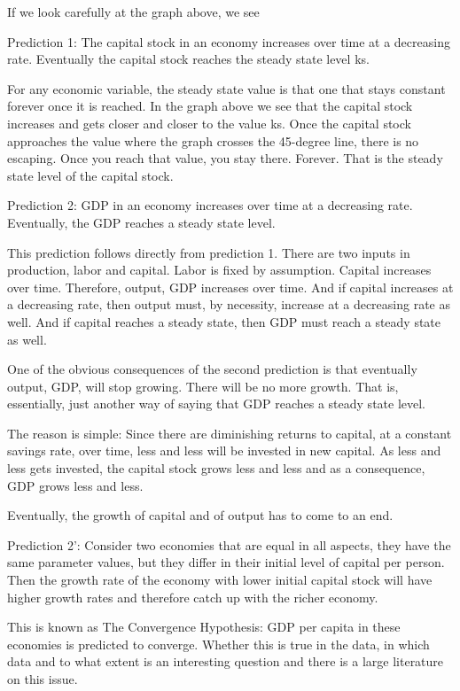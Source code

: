 \documentclass[
]{book}
\begin{document}
If we look carefully at the graph above, we see

Prediction 1: The capital stock in an economy increases over time at a decreasing rate. Eventually the capital stock reaches the steady state level ks.

For any economic variable, the steady state value is that one that stays constant forever once it is reached.
In the graph above we see that the capital stock increases and gets closer and closer to the value ks. Once the capital stock approaches the value where the graph crosses the 45-degree line, there is no escaping. Once you reach that value, you stay there. Forever. That is the steady state level of the capital stock.

Prediction 2: GDP in an economy increases over time at a decreasing rate. Eventually, the GDP reaches a steady state level.

This prediction follows directly from prediction 1. There are two inputs in production, labor and capital. Labor is fixed by assumption. Capital increases over time. Therefore, output, GDP increases over time. And if capital increases at a decreasing rate, then output must, by necessity, increase at a decreasing rate as well. And if capital reaches a steady state, then GDP must reach a steady state as well.

One of the obvious consequences of the second prediction is that eventually output, GDP, will stop growing. There will be no more growth. That is, essentially, just another way of saying that GDP reaches a steady state level.

The reason is simple: Since there are diminishing returns to capital, at a constant savings rate, over time, less and less will be invested in new capital. As less and less gets invested, the capital stock grows less and less and as a consequence, GDP grows less and less.

Eventually, the growth of capital and of output has to come to an end.

Prediction 2': Consider two economies that are equal in all aspects, they have the same parameter values, but they differ in their initial level of capital per person. Then the growth rate of the economy with lower initial capital stock will have higher growth rates and therefore catch up with the richer economy.

This is known as The Convergence Hypothesis: GDP per capita in these economies is predicted to converge. Whether this is true in the data, in which data and to what extent is an interesting question and there is a large literature on this issue.
\end{document}
